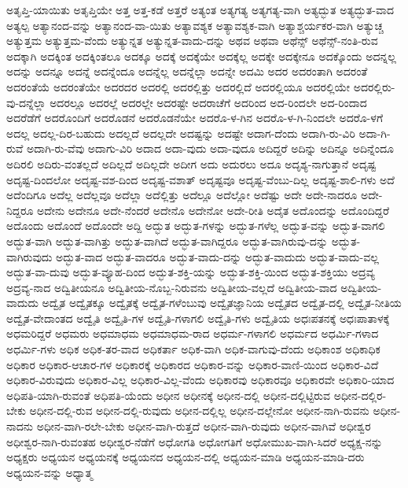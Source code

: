 {ಅತೃಪ್ತಿ-ಯಾಯಿತು
ಅತೃಪ್ತಿಯೇ
ಅತ್ತ
ಅತ್ತ-ಕಡೆ
ಅತ್ತರೆ
ಅತ್ಯಂತ
ಅತ್ಯಗತ್ಯ
ಅತ್ಯಗತ್ಯ-ವಾಗಿ
ಅತ್ಯದ್ಭುತ
ಅತ್ಯದ್ಭುತ-ವಾದ
ಅತ್ಯಲ್ಪ
ಅತ್ಯಾನಂದ-ವನ್ನು
ಅತ್ಯಾನಂದ-ವಾ-ಯಿತು
ಅತ್ಯಾವಶ್ಯಕ
ಅತ್ಯಾವಶ್ಯಕ-ವಾಗಿ
ಅತ್ಯಾಶ್ಚರ್ಯಕರ-ವಾಗಿ
ಅತ್ಯುಚ್ಚ
ಅತ್ಯುತ್ತಮ
ಅತ್ಯುತ್ತಮ-ವೆಂದು
ಅತ್ಯುನ್ನತ
ಅತ್ಯುನ್ನತ-ವಾದು-ದನ್ನು
ಅಥವ
ಅಥವಾ
ಅಥೆನ್ಸ್
ಅಥೆನ್ಸ್-ನಂತಿ-ರುವ
ಅದಕ್ಕಾಗಿ
ಅದಕ್ಕಿಂತ
ಅದಕ್ಕಿಂತಲೂ
ಅದಕ್ಕೂ
ಅದಕ್ಕೆ
ಅದಕ್ಕೆಯೇ
ಅದಕ್ಕೆಲ್ಲ
ಅದಕ್ಕೇ
ಅದಕ್ಕೇನೂ
ಅದಕ್ಕೊಂದು
ಅದನ್ನಲ್ಲ
ಅದನ್ನು
ಅದನ್ನೂ
ಅದನ್ನೆ
ಅದನ್ನೆಂದೂ
ಅದನ್ನೆಲ್ಲ
ಅದನ್ನೆಲ್ಲಾ
ಅದನ್ನೇ
ಅದಮಿ
ಅದರ
ಅದರಂತಾಗಿ
ಅದರಂತೆ
ಅದರಂತೆಯೆ
ಅದರಂತೆಯೇ
ಅದರದರ
ಅದರಲ್ಲಿ
ಅದರಲ್ಲಿತ್ತು
ಅದರಲ್ಲಿದೆ
ಅದರಲ್ಲಿಯೂ
ಅದರಲ್ಲಿಯೇ
ಅದರಲ್ಲಿರು-ವು-ದನ್ನೆಲ್ಲಾ
ಅದರಲ್ಲೂ
ಅದರಲ್ಲೆ
ಅದರಲ್ಲೇ
ಅದರಷ್ಟೇ
ಅದರಾಚೆಗೆ
ಅದರಿಂದ
ಅದ-ರಿಂದಲೇ
ಅದ-ರಿಂದಾದ
ಅದರೆಡೆಗೆ
ಅದರೊಂದಿಗೆ
ಅದರೊಡನೆ
ಅದರೊಡನೆಯೇ
ಅದರೊ-ಳ-ಗಿನ
ಅದರೊ-ಳ-ಗಿ-ನಿಂದಲೇ
ಅದರೊ-ಳಗೆ
ಅದಲ್ಲ
ಅದಲ್ಲ-ದಿರ-ಬಹುದು
ಅದಲ್ಲದೆ
ಅದಲ್ಲದೇ
ಅದಷ್ಟನ್ನು
ಅದಷ್ಟೇ
ಅದಾಗ-ದೆಂದು
ಅದಾಗಿ-ರು-ವಿರಿ
ಅದಾ-ಗಿ-ರುವೆ
ಅದಾಗಿ-ರು-ವೆವು
ಅದಾಗು-ವಿರಿ
ಅದಾದ
ಅದಾ-ವುದು
ಅದಾ-ವುದೂ
ಅದಿದ್ದರೆ
ಅದಿನ್ನು
ಅದಿನ್ನೂ
ಅದಿನ್ನೆಂದೂ
ಅದಿರಲಿ
ಅದಿರು-ವಂತಲ್ಲದೆ
ಅದಿಲ್ಲದೆ
ಅದಿಲ್ಲದೇ
ಅದೀಗ
ಅದು
ಅದುರಲು
ಅದೂ
ಅದೃಶ್ಯ-ನಾಗುತ್ತಾನೆ
ಅದೃಷ್ಟ
ಅದೃಷ್ಟ-ದಿಂದಲೋ
ಅದೃಷ್ಟ-ವಶ-ದಿಂದ
ಅದೃಷ್ಟ-ವಶಾತ್
ಅದೃಷ್ಟವೂ
ಅದೃಷ್ಟ-ವೆಂಬು-ದಿಲ್ಲ
ಅದೃಷ್ಟ-ಶಾಲಿ-ಗಳು
ಅದೆ
ಅದೆಂದಿಗೂ
ಅದೆಲ್ಲ
ಅದೆಲ್ಲವೂ
ಅದೆಲ್ಲಾ
ಅದೆಲ್ಲಿತ್ತು
ಅದೆಲ್ಲೂ
ಅದೆಲ್ಲೋ
ಅದೆಷ್ಟು
ಅದೇ
ಅದೇ-ನಾದರೂ
ಅದೇ-ನಿದ್ದರೂ
ಅದೇನು
ಅದೇನೂ
ಅದೇ-ನೆಂದರೆ
ಅದೇನೊ
ಅದೇನೋ
ಅದೇ-ರೀತಿ
ಅದೈತ
ಅದೊಂದನ್ನು
ಅದೊಂದಿದ್ದರೆ
ಅದೊಂದು
ಅದೊಂದೆ
ಅದೊಂದೇ
ಅದ್ದಿ
ಅದ್ಭುತ
ಅದ್ಭುತ-ಗಳನ್ನು
ಅದ್ಭುತ-ಗಳೆಲ್ಲ
ಅದ್ಭುತ-ವನ್ನು
ಅದ್ಭುತ-ವಾಗಲಿ
ಅದ್ಭುತ-ವಾಗಿ
ಅದ್ಭುತ-ವಾಗಿತ್ತು
ಅದ್ಭುತ-ವಾಗಿದೆ
ಅದ್ಭುತ-ವಾಗಿದ್ದರೂ
ಅದ್ಭುತ-ವಾಗಿರುವು-ದನ್ನು
ಅದ್ಭುತ-ವಾಗಿರುವುದು
ಅದ್ಭುತ-ವಾದ
ಅದ್ಭುತ-ವಾದರೂ
ಅದ್ಭುತ-ವಾದು-ದನ್ನು
ಅದ್ಭುತ-ವಾದುದು
ಅದ್ಭುತ-ವಾದು-ವಲ್ಲ
ಅದ್ಭುತ-ವಾ-ದುವು
ಅದ್ಭುತ-ವ್ಯೂಹ-ದಿಂದ
ಅದ್ಭುತ-ಶಕ್ತಿ-ಯನ್ನು
ಅದ್ಭುತ-ಶಕ್ತಿ-ಯಿಂದ
ಅದ್ಭುತ-ಶಕ್ತಿಯು
ಅದ್ರವ್ಯ
ಅದ್ರವ್ಯ-ನಾದ
ಅದ್ವಿತೀಯನೂ
ಅದ್ವಿತೀಯ-ನೊಬ್ಬ-ನಿರುವನು
ಅದ್ವಿತೀಯ-ವಲ್ಲದೆ
ಅದ್ವಿತೀಯ-ವಾದ
ಅದ್ವಿತೀಯ-ವಾದುದು
ಅದ್ವೈತ
ಅದ್ವೈತಕ್ಕೂ
ಅದ್ವೈತಕ್ಕೆ
ಅದ್ವೈತ-ಗಳೆಂಬುವು
ಅದ್ವೈತಜ್ಞಾನಿಯ
ಅದ್ವೈತದ
ಅದ್ವೈತ-ದಲ್ಲಿ
ಅದ್ವೈತ-ನೀತಿಯ
ಅದ್ವೈತ-ವೇದಾಂತದ
ಅದ್ವೈತಿ
ಅದ್ವೈತಿ-ಗಳ
ಅದ್ವೈತಿ-ಗಳಾಗಲಿ
ಅದ್ವೈತಿ-ಗಳು
ಅದ್ವೈತಿಯ
ಅಧಃಪತನಕ್ಕೆ
ಅಧಃಪಾತಾಳಕ್ಕೆ
ಅಧಮರಿದ್ದರೆ
ಅಧಮರು
ಅಧಮಾಧಮ
ಅಧಮಾಧಮ-ರಾದ
ಅಧರ್ಮ-ಗಳಾಗಲಿ
ಅಧರ್ಮದ
ಅಧರ್ಮಿ-ಗಳಾದ
ಅಧರ್ಮಿ-ಗಳು
ಅಧಿಕ
ಅಧಿಕ-ತರ-ವಾದ
ಅಧಿಕರ್ತಾ
ಅಧಿಕ-ವಾಗಿ
ಅಧಿಕ-ವಾಗುವು-ದೆಂದು
ಅಧಿಕಾಂಶ
ಅಧಿಕಾಧಿಕ
ಅಧಿಕಾರ
ಅಧಿಕಾರ-ಆಚಾರ-ಗಳ
ಅಧಿಕಾರಕ್ಕೆ
ಅಧಿಕಾರದ
ಅಧಿಕಾರ-ವನ್ನು
ಅಧಿಕಾರ-ವಾಣಿ-ಯಿಂದ
ಅಧಿಕಾರ-ವಿದೆ
ಅಧಿಕಾರ-ವಿರುವುದು
ಅಧಿಕಾರ-ವಿಲ್ಲ
ಅಧಿಕಾರ-ವಿಲ್ಲ-ವೆಂದು
ಅಧಿಕಾರವು
ಅಧಿಕಾರವೂ
ಅಧಿಕಾರವೇ
ಅಧಿಕಾರಿ-ಯಾದ
ಅಧಿಪತಿ-ಯಾಗಿ-ರುವಂತೆ
ಅಧಿಪತಿ-ಯೆಂದು
ಅಧೀನ
ಅಧೀನಕ್ಕೆ
ಅಧೀನ-ದಲ್ಲಿ
ಅಧೀನ-ದಲ್ಲಿಟ್ಟಿರುವ
ಅಧೀನ-ದಲ್ಲಿರ-ಬೇಕು
ಅಧೀನ-ದಲ್ಲಿ-ರುವ
ಅಧೀನ-ದಲ್ಲಿ-ರುವುದು
ಅಧೀನ-ದಲ್ಲಿಲ್ಲ
ಅಧೀನ-ದಲ್ಲೇನೋ
ಅಧೀನ-ನಾಗಿ-ರುವನು
ಅಧೀನ-ನಾದನು
ಅಧೀನ-ವಾಗಿ-ರಲೇ-ಬೇಕು
ಅಧೀನ-ವಾಗಿ-ರುತ್ತದೆ
ಅಧೀನ-ವಾಗಿ-ರುವುದು
ಅಧೀನ-ವಾಗಿವೆ
ಅಧೀಶ್ವರ
ಅಧೀಶ್ವರ-ನಾಗಿ-ರುವಂತಹ
ಅಧೀಶ್ವರ-ನೆಡೆಗೆ
ಅಧೋಗತಿ
ಅಧೋಗತಿಗೆ
ಅಧೋಮುಖ-ವಾಗಿ-ಸಿದರೆ
ಅಧ್ಯಕ್ಷ-ನನ್ನು
ಅಧ್ಯಕ್ಷರು
ಅಧ್ಯಯನ
ಅಧ್ಯಯನಕ್ಕೆ
ಅಧ್ಯಯನದ
ಅಧ್ಯಯನ-ದಲ್ಲಿ
ಅಧ್ಯಯನ-ಮಾಡಿ
ಅಧ್ಯಯನ-ಮಾಡಿ-ದರು
ಅಧ್ಯಯನ-ವನ್ನು
ಅಧ್ಯಾತ್ಮ
}
